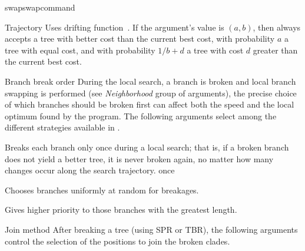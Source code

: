 \begin{command}{swap}{swapcommand}
\begin{arguments}
\begin{argumentgroup}{Trajectory}
                {Uses \poy drifting function~\cite{goloboff1999}. If the argument's value is
                $(a, b)$, then \poy always accepts a tree with better cost than
                the current best cost, with probability $a$ a tree with equal cost,
                and with probability $1 / b + d$ a tree with cost $d$ greater
                than the current best cost.}
                {}

	    \end{argumentgroup}

	    \begin{argumentgroup}{Branch break order}
            {During the local search, a branch is broken and local branch swapping
            is performed (see \emph{Neighborhood} group of arguments), the
            precise choice of which branches
            should be broken first can affect both the speed and the local
            optimum found by the program. The following arguments select among
            the different strategies available in \poy.}
        
                {Breaks each branch only once during a local search; that is, if a
                broken branch does not yield a better tree, it is never broken again,
                no matter how many changes occur along the search trajectory.}
                {once}

                {Chooses branches uniformly at random for breakages.}
                {}

                {Gives higher priority to those branches with the greatest length.}
                {}

        \end{argumentgroup}

        \begin{argumentgroup}{Join method}
            {After breaking a tree (using SPR or TBR), the following 
            arguments control the selection of the positions to join the broken
            clades.}


\end{argumentgroup}
\end{arguments}
\end{command}
